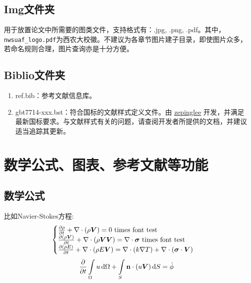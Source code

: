 \subsection{Img文件夹}

用于放置论文中所需要的图类文件，支持格式有：.jpg, .png, .pdf。其中，\verb|nwsuaf_logo.pdf|为西农大校徽。不建议为各章节图片建子目录，即使图片众多，若命名规则合理，图片查询亦是十分方便。

\subsection{Biblio文件夹}

\begin{enumerate}
    \item ref.bib：参考文献信息库。
    \item gbt7714-xxx.bst：符合国标的文献样式定义文件。由 \href{https://github.com/zepinglee/gbt7714-bibtex-style}{zepinglee}  开发，并满足最新国标要求。与文献样式有关的问题，请查阅开发者所提供的文档，并建议适当追踪其更新。
\end{enumerate}

\section{数学公式、图表、参考文献等功能}

\subsection{数学公式}

比如Navier-Stokes方程:
\begin{equation} \label{eq:ns}
    \begin{cases}
        \frac{\partial \rho}{\partial t} + \nabla\cdot(\rho\Vector{V}) = 0 \ \mathrm{times\ font\ test}\\
        \frac{\partial (\rho\Vector{V})}{\partial t} + \nabla\cdot(\rho\Vector{V}\Vector{V}) = \nabla\cdot\Tensor{\sigma} \ \text{times font test}\\
        \frac{\partial (\rho E)}{\partial t} + \nabla\cdot(\rho E\Vector{V}) = \nabla\cdot(k\nabla T) + \nabla\cdot(\Tensor{\sigma}\cdot\Vector{V})
    \end{cases}
\end{equation}
\begin{equation}
    \frac{\partial }{\partial t}\int\limits_{\Omega} u \, \mathrm{d}\Omega + \int\limits_{S} \boldsymbol{\mathbf{n}}\cdot(u\boldsymbol{V}) \, \mathrm{d}S = \dot{\phi}
\end{equation}


